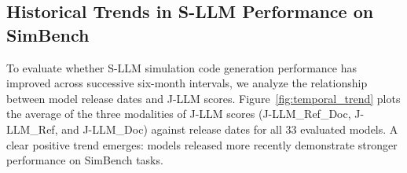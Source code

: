\subsection{Historical Trends in S-LLM Performance on SimBench}

To evaluate whether S-LLM simulation code generation performance has improved across successive six-month intervals, we analyze the relationship between model release dates and J-LLM scores. Figure~\ref{fig:temporal_trend} plots the average of the three modalities of J-LLM scores (J-LLM\_Ref\_Doc, J-LLM\_Ref, and J-LLM\_Doc) against release dates for all 33 evaluated models. 
A clear positive trend emerges: models released more recently demonstrate stronger performance on SimBench tasks. 

